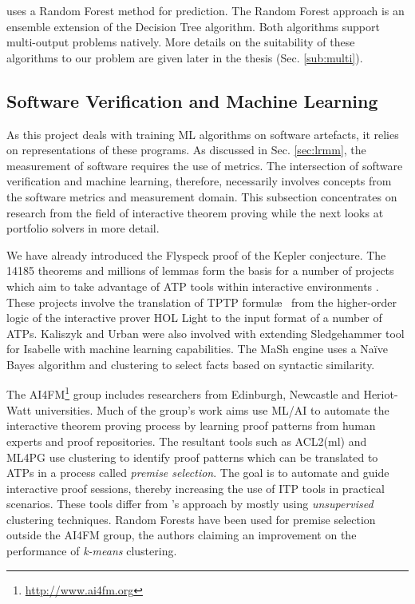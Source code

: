 \where uses a Random Forest \cite{RandomForests} method for prediction. The Random Forest approach is an ensemble extension of the Decision Tree \cite{DecisionTrees} algorithm. Both algorithms support multi-output problems natively. More details on the suitability of these algorithms to our problem are given later in the thesis (Sec. \ref{sub:multi}). 



\subsection{Software Verification and Machine Learning}
\label{sub:lrsvml}

As this project deals with training ML algorithms on software artefacts, it relies on representations of these programs. As discussed in Sec. \ref{sec:lrmm}, the measurement of software requires the use of metrics. The intersection of software verification and machine learning, therefore, necessarily involves concepts from the software metrics and measurement domain. This subsection concentrates on research from the field of interactive theorem proving while the next looks at portfolio solvers in more detail.

We have already introduced the Flyspeck \cite{hales-kepler} proof of the Kepler conjecture. The 14185 theorems and millions of lemmas form the basis for a number of projects which aim to take advantage of ATP tools within interactive environments \cite{Flyspec, Kaliszyk2015109}. These projects involve the translation of TPTP formul\ae~  from the higher-order logic of the  interactive prover \textsf{HOL Light} to the input format of a number of ATPs. Kaliszyk and Urban were also involved with extending Sledgehammer \cite{threeyears} tool for Isabelle \cite{Isabelle} with machine learning capabilities. The MaSh \cite{Sledgehammer} engine uses a Na{\"i}ve Bayes algorithm and clustering to select facts based on syntactic similarity.       

The AI4FM\footnote{\url{http://www.ai4fm.org}} group includes researchers from Edinburgh, Newcastle and Heriot-Watt universities. Much of the group's work \cite{Heras2013, ML4PG, bundy_et_al:DR:2012:3731} aims use ML/AI to automate the interactive theorem proving process by learning proof patterns from human experts and proof repositories. The resultant tools such as ACL2(ml) \cite{Heras2013} and ML4PG \cite{ML4PG} use clustering to identify proof patterns which can be translated to ATPs in a process called \textit{premise selection}. The goal is to automate and guide interactive proof sessions, thereby increasing the use of ITP tools in practical scenarios. These tools differ from \where's approach by mostly using \textit{unsupervised} clustering techniques. Random Forests have been used for premise selection \cite{Farber2015} outside the AI4FM group, the authors claiming an improvement on the performance of \textit{k-means} clustering. 

